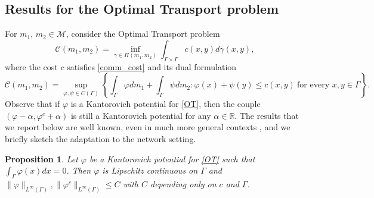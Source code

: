 \documentclass[smallextended,referee,envcountsect,]{svjour3}
\newcommand{\R}{{\mathbb{R}}}
\newcommand{\G}{\Gamma}
\newcommand{\cC}{{\mathcal C}}
\newcommand{\cM}{{\mathcal M}}
\renewcommand{\phi}{\varphi}
\renewcommand{\a}{{\alpha}}
\newtheorem{prop}[theo]{\bf Proposition}
\begin{document}
\subsection{Results for the Optimal Transport problem}
For $m_1$, $m_2\in\cM$, consider the Optimal Transport problem
\begin{equation}\label{OT}
	 \cC(m_1, m_2)=\inf_{\gamma\in\Pi(m_1, m_2)}\int_{\Gamma\times\Gamma}c(x, y)d\gamma(x, y),
\end{equation}
where the cost $c$  satisfies \eqref{comm_cost} and its dual formulation
$$ \cC(m_1, m_2)=\sup_{\phi, \psi\in C(\Gamma)}\left\{\int_{\Gamma}\phi dm_1+\int_{\Gamma}\psi dm_2:\phi(x)+\psi(y)\leq c(x, y)\ \text{for every }x,y\in\Gamma\right\}.	$$
Observe that if $\phi$ is a Kantorovich potential for \eqref{OT}, then the couple $(\phi-\alpha, \phi^c+\alpha)$ is still a Kantorovich potential for any $\a\in\R$.
The results that we report below are well known, even in much more general contexts \cite{santambrogio,villani2}, and  we briefly sketch the adaptation to the network setting.
\begin{prop}\label{normkantorovich}
	Let $\phi$ be a Kantorovich potential for \eqref{OT} such that $\int_{\Gamma}\phi(x)dx=0$. Then $\phi$ is Lipschitz continuous on $\G$ and $\|\phi\|_{L^\infty(\G)}, \|\phi^c\|_{L^\infty(\G)} \le C$ with $C$ depending only on $c$ and $\Gamma$.
\end{prop}
\end{document}
